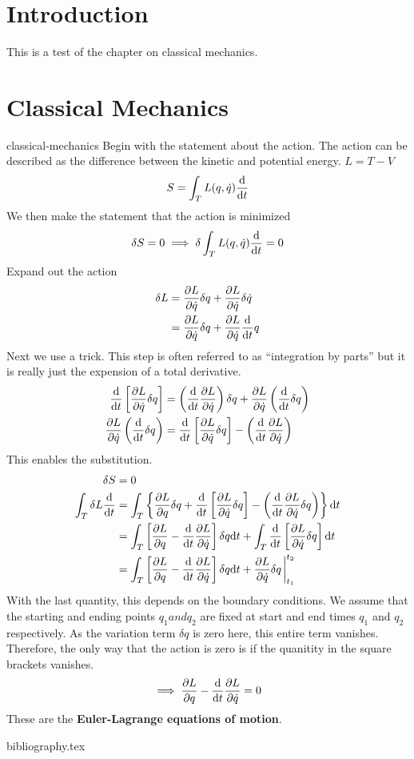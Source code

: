 \documentclass[12pt]{book}
\begin{document}
\chapter{Introduction}
This is a test of the chapter on classical mechanics.

\chapter{Classical Mechanics}
{classical-mechanics}
Begin with the statement about the action. The action can be described as
the difference between the kinetic and potential energy. $L = T - V$
\begin{equation}
    S = \int_T L(q,\dot{q}) \dv{t} 
\end{equation}
We then make the statement that the action is minimized
\begin{equation}
    \delta S = 0 \implies \delta \int_T L(q,\dot{q}) \dv{t} = 0
\end{equation}
Expand out the action
\begin{align}
    \delta L &= \pdv{L}{\dot{q}}\delta q + \pdv{L}{\dot{q}}\delta \dot{q} \\
             &= \pdv{L}{\dot{q}}\delta q + \pdv{L}{\dot{q}}\dv{t} q
\end{align}
Next we use a trick. This step is often referred to as ``integration by parts''
but it is really just the expension of a total derivative.
\begin{align}
    \dv{t}\left[ \pdv{L}{\dot{q}}\delta q \right] &= \left( \dv{t}\pdv{L}{\dot{q}} \right) \delta q + \pdv{L}{\dot{q}} \left( \dv{t} \delta q \right) \\
    \pdv{L}{\dot{q}} \left( \dv{t} \delta q \right) &= \dv{t}\left[ \pdv{L}{\dot{q}}\delta q \right] - \left( \dv{t}\pdv{L}{\dot{q}} \right)  
\end{align}
This enables the substitution.
\begin{align}
    \delta S &= 0 \\
    \int_T \delta L \dv{t} &= \int_T \left\{ \pdv{L}{q} \delta q + \dv{t}\left[ \pdv{L}{\dot{q}} \delta q \right] - \left( \dv{t}\pdv{L}{\dot{q}}\delta q \right) \right\} \dd t \\
                           &= \int_T \left[ \pdv{L}{q} - \dv{t}\pdv{L}{\dot{q}} \right]\delta q \dd t + \int_T \dv{t}\left[ \pdv{L}{\dot{q}}\delta q \right]\dd t \\
                           &= \int_T \left[ \pdv{L}{q} - \dv{t}\pdv{L}{\dot{q}} \right]\delta q \dd t + \pdv{L}{\dot{q}}\delta q \eval^{t_2}_{t_1}
\end{align}
With the last quantity, this depends on the boundary conditions. We assume that
the starting and ending points $q_1 and q_2$ are fixed at start and end times
$q_1$ and $q_2$ respectively. As the variation term $\delta q$ is zero here,
this entire term vanishes. Therefore, the only way that the action is zero is if
the quanitity in the square brackets vanishes.
\begin{equation}
    \implies \pdv{L}{q} - \dv{t}\pdv{L}{\dot{q}} = 0
\end{equation}
These are the \textbf{Euler-Lagrange equations of motion}.


{bibliography.tex}
\end{document}
